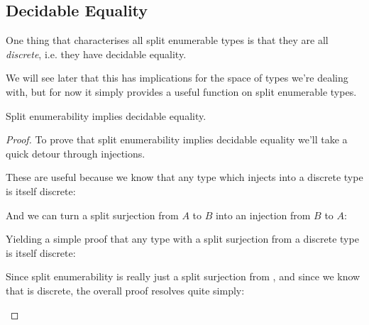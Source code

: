 \subsection{Decidable Equality}
One thing that characterises all split enumerable types is that they are all
\emph{discrete}, i.e. they have decidable equality. 
\begin{agdalisting*}
  \begin{multicols}{2} \null \vfill
     \vfill \null \columnbreak
  \end{multicols}
\end{agdalisting*}
We will see later that this has implications for the space of types we're
dealing with, but for now it simply provides a useful function on split
enumerable types.
\begin{lemma} \label{split-enum-discrete}
  Split enumerability implies decidable equality.
\end{lemma}
\begin{proof}
To prove that split enumerability implies decidable equality we'll take a quick
detour through injections.
\begin{agdalisting*}
  \begin{multicols}{2}
     \columnbreak
  \end{multicols}
\end{agdalisting*}
These are useful because we know that any type which injects into a discrete
type is itself discrete:
\begin{agdalisting*}
\end{agdalisting*}
And we can turn a split surjection from \(A\) to \(B\) into an injection from
\(B\) to \(A\):
\begin{agdalisting*}
\end{agdalisting*}
Yielding a simple proof that any type with a split surjection from a discrete
type is itself discrete:
\begin{agdalisting*}
\end{agdalisting*}
Since split enumerability is really just a split surjection from
, and since we know that  is discrete, the
overall proof resolves quite simply:
\begin{agdalisting*}
\end{agdalisting*}
\end{proof}
